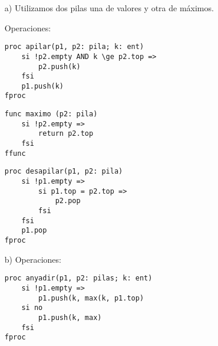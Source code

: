 \documentclass[10pt,a4paper,openright]{book}
\theoremstyle{break}
\begin{document}
\begin{enumerate}
\item[a)] Utilizamos dos pilas una de valores y otra de máximos.

Operaciones:
\begin{lstlisting}
proc apilar(p1, p2: pila; k: ent)
    si !p2.empty AND k \ge p2.top =>
        p2.push(k)
    fsi
    p1.push(k)
fproc 
\end{lstlisting}

\begin{lstlisting}
func maximo (p2: pila)
    si !p2.empty => 
        return p2.top
    fsi
ffunc
\end{lstlisting}

\begin{lstlisting}
proc desapilar(p1, p2: pila)
    si !p1.empty =>
        si p1.top = p2.top =>
            p2.pop
        fsi
    fsi
    p1.pop
fproc
\end{lstlisting}
\item[b)] Operaciones:

\begin{lstlisting}
proc anyadir(p1, p2: pilas; k: ent) 
    si !p1.empty =>
        p1.push(k, max(k, p1.top)
    si no
        p1.push(k, max)
    fsi
fproc
\end{lstlisting}
\end{enumerate}
\end{document}
